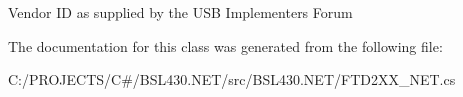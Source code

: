 Vendor ID as supplied by the U\+SB Implementers Forum 



The documentation for this class was generated from the following file\+:\begin{DoxyCompactItemize}
\item 
C\+:/\+P\+R\+O\+J\+E\+C\+T\+S/\+C\#/\+B\+S\+L430.\+N\+E\+T/src/\+B\+S\+L430.\+N\+E\+T/F\+T\+D2\+X\+X\+\_\+\+N\+E\+T.\+cs\end{DoxyCompactItemize}
